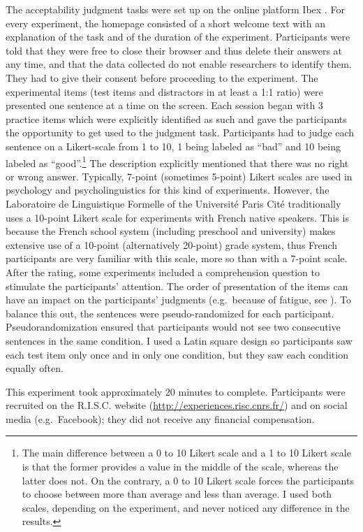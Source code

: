 The acceptability judgment tasks were set up on the online platform Ibex \citep{Ibex}. For every experiment, the homepage consisted of a short welcome text with an explanation of the task and of the duration of the experiment. Participants were told that they were free to close their browser and thus delete their answers at any time, and that the data collected do not enable researchers to identify them. They had to give their consent before proceeding to the experiment. The experimental items (test items and distractors in at least a 1:1 ratio) were presented one sentence at a time on the screen. Each session began with 3 practice items which were explicitly identified as such and gave the participants the opportunity to get used to the judgment task. Participants had to judge each sentence on a Likert-scale from 1 to 10, 1 being labeled as ``bad'' and 10 being labeled as ``good''.\footnote{The main difference between a 0 to 10 Likert scale and a 1 to 10 Likert scale is that the former provides a value in the middle of the scale, whereas the latter does not. On the contrary, a 0 to 10 Likert scale forces the participants to choose between more than average and less than average. I used both scales, depending on the experiment, and never noticed any difference in the results.} The description explicitly mentioned that there was no right or wrong answer. Typically, 7-point (sometimes 5-point) Likert scales are used in psychology and psycholinguistics for this kind of experiments. However, the Laboratoire de Linguistique Formelle of the Université Paris Cité traditionally uses a 10-point Likert scale for experiments with French native speakers. This is because the French school system (including preschool and university) makes extensive use of a 10-point (alternatively 20-point) grade system, thus French participants are very familiar with this scale, more so than with a 7-point scale. After the rating, some experiments included a comprehension question to stimulate the participants' attention.
The order of presentation of the items can have an impact on the participants' judgments (e.g.\ because of fatigue, see \citealt[180--181]{Schutze.2016.ex1996}). To balance this out, the sentences were pseudo-randomized for each participant. Pseudorandomization ensured that participants would not see two consecutive sentences in the same condition. I used a Latin square design so participants saw each test item only once and in only one condition, but they saw each condition equally often. 

This experiment took approximately 20 minutes to complete. Participants were recruited on the R.I.S.C. website (\url{http://experiences.risc.cnrs.fr/}) and on social media (e.g.\ Facebook); they did not receive any financial compensation. 

